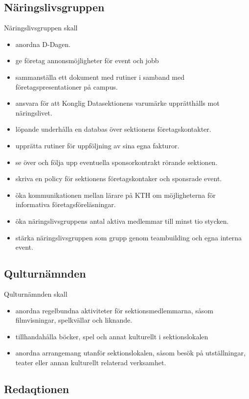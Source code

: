\documentclass{dgovdoc}
\begin{document}
\subsection{Näringslivsgruppen}

Näringslivsgruppen skall

\begin{itemize}
\item anordna D-Dagen.
\item ge företag annonsmöjligheter för event och jobb
\item sammanställa ett dokument med rutiner i samband med
  företagspresentationer på campus.
\item ansvara för att Konglig Datasektionens varumärke upprätthålls mot
  näringslivet.
\item löpande underhålla en databas över sektionens företagskontakter.
\item upprätta rutiner för uppföljning av sina egna fakturor.
\item se över och följa upp eventuella sponsorkontrakt rörande sektionen.
\item skriva en policy för sektionens företagskontaker och sponsrade event.
\item öka kommunikationen mellan lärare på KTH om möjligheterna för informativa
  företagsföreläsningar.
\item öka näringslivsgruppens antal aktiva medlemmar till minst tio stycken.
\item stärka näringslivsgruppen som grupp genom teambuilding och egna interna
  event.
\end{itemize}

\subsection{Qulturnämnden}

Qulturnämnden skall

\begin{itemize}
\item anordna regelbundna aktiviteter för sektionsmedlemmarna, såsom
  filmvisningar, spelkvällar och liknande.
\item tillhandahålla böcker, spel och annat kulturellt i sektionslokalen
\item anordna arrangemang utanför sektionslokalen, såsom besök på
  utställningar, teater eller annan kulturellt relaterad verksamhet.
\end{itemize}

\subsection{Redaqtionen}
\end{document}
